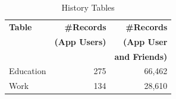 \begin{table}
\centering
\caption{\small History Tables}
\label{tab:history}
\begin{tabular}{|>{\small}p{2cm}|>{\small}r|>{\small}r|}
\hline
\textbf{Table} & \textbf{\#Records} & \textbf{\#Records} \\
& \textbf{(App Users)} & \textbf{(App User} \\
& & \textbf{and Friends)} \\
\hline
Education & 275 & 66,462 \\
\hline
Work & 134 & 28,610 \\
\hline
\end{tabular}
\end{table}






